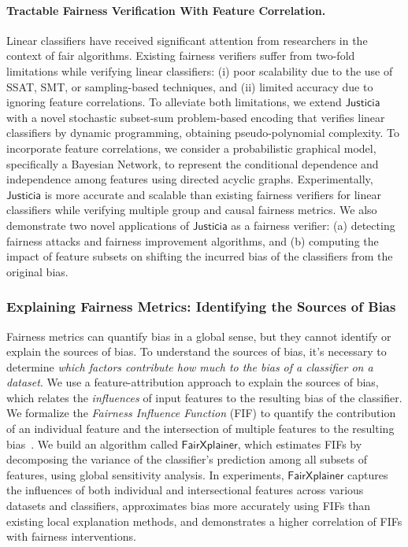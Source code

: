 \documentclass[11pt]{article}
\begin{document}
	
	\paragraph{Tractable Fairness Verification With Feature Correlation.} Linear classifiers have received significant attention from researchers in the context of fair algorithms. Existing fairness verifiers suffer from two-fold limitations while verifying linear classifiers: (i) poor scalability due to the use of SSAT, SMT, or sampling-based techniques, and (ii) limited accuracy due to ignoring feature correlations. To alleviate both limitations, we extend $\mathsf{Justicia}$ with a novel stochastic subset-sum problem-based encoding that verifies linear classifiers by dynamic programming, obtaining pseudo-polynomial complexity. To incorporate feature correlations, we consider a probabilistic graphical model, specifically a Bayesian Network, to represent the conditional dependence and independence among features using directed acyclic graphs. Experimentally, $\mathsf{Justicia}$ is more accurate and scalable than existing fairness verifiers for linear classifiers while verifying multiple group and causal fairness metrics. We also demonstrate two novel applications of $\mathsf{Justicia}$ as a fairness verifier: (a) detecting fairness attacks and fairness improvement algorithms, and (b) computing the impact of feature subsets on shifting the incurred bias of the classifiers from the original bias.
	
	
	
	
	
	
	\subsubsection*{Explaining Fairness Metrics: Identifying the Sources of Bias}
	Fairness metrics can quantify bias in a global sense, but they cannot identify or explain the sources of bias. To understand the sources of bias, it's necessary to determine \textit{which factors contribute how much to the bias of a classifier on a dataset}. We use a feature-attribution approach to explain the sources of bias, which relates the \emph{influences} of input features to the resulting bias of the classifier. We formalize the \textit{Fairness Influence Function} (FIF) to quantify the contribution of an individual feature and the intersection of multiple features to the resulting bias~\cite{ghosh2022how}. We build an algorithm called $\mathsf{FairXplainer}$, which estimates FIFs by decomposing the variance of the classifier's prediction among all subsets of features, using global sensitivity analysis. In experiments, $\mathsf{FairXplainer}$ captures the influences of both individual and intersectional features across various datasets and classifiers, approximates bias more accurately using FIFs than existing local explanation methods, and demonstrates a higher correlation of FIFs with fairness interventions.
	
\end{document}

